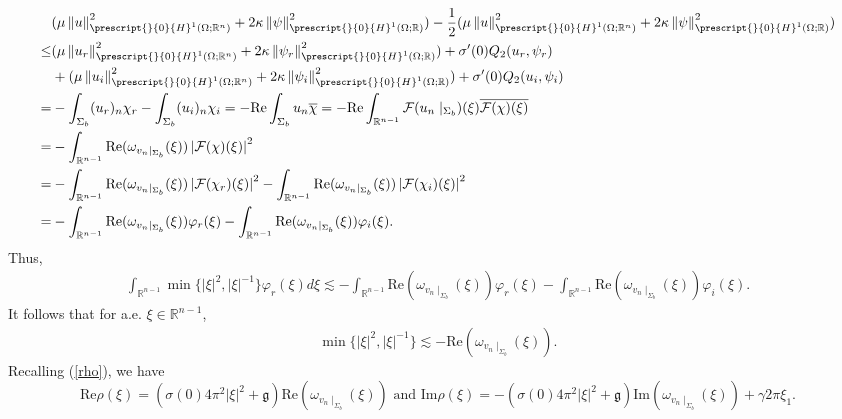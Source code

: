 \documentclass[11pt,letterpaper,reqno]{amsart}
\numberwithin{equation}{section}
\newcommand{\abs}[1]{\left\lvert#1\right\rvert}
\newcommand{\norm}[1]{\left\lVert#1\right\rVert}
\newcommand{\re}{\mbox{Re}}
\newcommand{\im}{\mbox{Im}}
\begin{document}
\begin{align}
    &(\mu\norm{u}_{\prescript{}{0}{H}^{1}(\Omega;\mathbb{R}^{n})}^{2}+2\kappa\norm{\psi}_{\prescript{}{0}{H}^{1}(\Omega;\mathbb{R})}^{2})-\frac{1}{2}(\mu\norm{u}_{\prescript{}{0}{H}^{1}(\Omega;\mathbb{R}^{n})}^{2}+2\kappa\norm{\psi}_{\prescript{}{0}{H}^{1}(\Omega;\mathbb{R})}^{2}) \nonumber\\
    \leq&(\mu\norm{u_{r}}_{\prescript{}{0}{H}^{1}(\Omega;\mathbb{R}^{n})}^{2}+2\kappa\norm{\psi_{r}}_{\prescript{}{0}{H}^{1}(\Omega;\mathbb{R})}^{2})+\sigma'(0)Q_{2}(u_{r},\psi_{r}) \nonumber\\
    &+(\mu\norm{u_{i}}_{\prescript{}{0}{H}^{1}(\Omega;\mathbb{R}^{n})}^{2}+2\kappa\norm{\psi_{i}}_{\prescript{}{0}{H}^{1}(\Omega;\mathbb{R})}^{2})+\sigma'(0)Q_{2}(u_{i},\psi_{i}) \nonumber\\
    =&-\int_{\Sigma_{b}}(u_{r})_{n}\chi_{r}-\int_{\Sigma_{b}}(u_{i})_{n}\chi_{i} =-\re\int_{\Sigma_{b}}u_{n}\overline{\chi} =-\re\int_{\mathbb{R}^{n-1}}\mathcal{F}(u_{n}\mid_{\Sigma_{b}})(\xi)\overline{\mathcal{F}(\chi)(\xi)} \nonumber\\
    =&-\int_{\mathbb{R}^{n-1}}\re(\omega_{v_{n}\mid_{\Sigma_{b}}}(\xi))\abs{\mathcal{F}(\chi)(\xi)}^{2} \nonumber\\
    =&-\int_{\mathbb{R}^{n-1}}\re(\omega_{v_{n}\mid_{\Sigma_{b}}}(\xi))\abs{\mathcal{F}(\chi_{r})(\xi)}^{2} -\int_{\mathbb{R}^{n-1}}\re(\omega_{v_{n}\mid_{\Sigma_{b}}}(\xi))\abs{\mathcal{F}(\chi_{i})(\xi)}^{2} \nonumber\\
    =&-\int_{\mathbb{R}^{n-1}}\re(\omega_{v_{n}\mid_{\Sigma_{b}}}(\xi))\varphi_{r}(\xi)-\int_{\mathbb{R}^{n-1}}\re(\omega_{v_{n}\mid_{\Sigma_{b}}}(\xi))\varphi_{i}(\xi).
\end{align}
Thus,
\begin{align}
    \int_{\mathbb{R}^{n-1}}\min\{\abs{\xi}^{2},\abs{\xi}^{-1}\}\varphi_{r}(\xi)d\xi \lesssim -\int_{\mathbb{R}^{n-1}}\re(\omega_{v_{n}\mid_{\Sigma_{b}}}(\xi))\varphi_{r}(\xi)-\int_{\mathbb{R}^{n-1}}\re(\omega_{v_{n}\mid_{\Sigma_{b}}}(\xi))\varphi_{i}(\xi).
\end{align}
It follows that for a.e. \(\xi \in \mathbb{R}^{n-1}\),
\begin{align} \label{revntrfs}
    \min\{\abs{\xi}^{2},\abs{\xi}^{-1}\} \lesssim -\re(\omega_{v_{n} \mid_{\Sigma_{b}}}(\xi)).
\end{align}
Recalling (\ref{rho}), we have
\begin{equation}
    \re\rho(\xi)=(\sigma(0)4\pi^{2}\abs{\xi}^{2}+\mathfrak{g})\re(\omega_{v_{n}\mid_{\Sigma_{b}}}(\xi)) \text{ and }
    \im\rho(\xi)=-(\sigma(0)4\pi^{2}\abs{\xi}^{2}+\mathfrak{g})\im(\omega_{v_{n}\mid_{\Sigma_{b}}}(\xi))+\gamma 2\pi \xi_{1}.
\end{equation}
\end{document}
